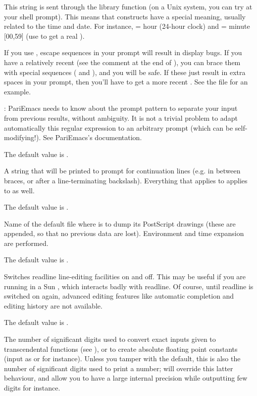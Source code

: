 This string is sent through the library function  (on a
Unix system, you can try  at your shell prompt). This means
that \kbd{\%} constructs have a special meaning, usually related to the time
and date. For instance,  = hour (24-hour clock) and  =
minute [00,59] (use \kbd{\%\%} to get a real \kbd{\%}).

If you use , escape sequences in your prompt will result in
display bugs. If you have a relatively recent  (see the comment
at the end of ), you can brace them with special sequences
(\kbd{\bs[} and \kbd{\bs]}), and you will be safe. If these just result in
extra spaces in your prompt, then you'll have to get a more recent
. See the file  for an example.

: PariEmacs needs to know about the prompt pattern to
separate your input from previous  results, without ambiguity. It is
not a trivial problem to adapt automatically this regular expression to an
arbitrary prompt (which can be self-modifying!). See PariEmacs's
documentation.

The default value is .

\label{se:def,prompt_cont}
A string that will be printed
to prompt for continuation lines (e.g. in between braces, or after a
line-terminating backslash). Everything that applies to 
applies to  as well.

The default value is .

\label{se:def,psfile}
Name of the default file where
 is to dump its PostScript drawings (these are appended, so that no
previous data are lost). Environment and time expansion are performed.

The default value is .

\label{se:def,readline}
Switches readline line-editing
facilities on and off. This may be useful if you are running  in a Sun
, which interacts badly with readline. Of course, until readline
is switched on again, advanced editing features like automatic completion
and editing history are not available.

The default value is .

\label{se:def,realprecision}
The number of significant digits used to convert exact inputs given to
transcendental functions (see ), or to create
absolute floating point constants (input as  or  for
instance). Unless you tamper with the  default, this is also
the number of significant digits used to print a  number;
 will override this latter behaviour, and allow you to have a
large internal precision while outputting few digits for instance.


